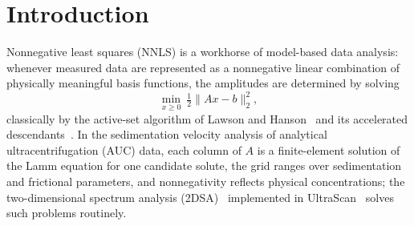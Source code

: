 \documentclass[pdflatex,sn-mathphys-num]{sn-jnl}
\theoremstyle{thmstyleone}
\theoremstyle{thmstyletwo}
\begin{document}
\maketitle

\section{Introduction}\label{sec:intro}

Nonnegative least squares (NNLS) is a workhorse of model-based data
analysis: whenever measured data are represented as a nonnegative linear
combination of physically meaningful basis functions, the amplitudes are
determined by solving
\begin{equation*}
\min_{x\ge 0}\ \tfrac12\lVert Ax-b\rVert_2^2,
\end{equation*}
classically by the active-set algorithm of Lawson and
Hanson~\cite{lawson1974} and its accelerated
descendants~\cite{bro1997,vanbenthem2004,kim2011,myre2017,dessole2023}. In the sedimentation
velocity analysis of analytical ultracentrifugation (AUC) data, each
column of $A$ is a finite-element solution of the Lamm equation for one
candidate solute, the grid ranges over sedimentation and frictional
parameters, and nonnegativity reflects physical concentrations; the
two-dimensional spectrum analysis (2DSA)~\cite{brookes2010}
implemented in UltraScan~\cite{demeler2005} solves such problems
routinely.
\end{document}
